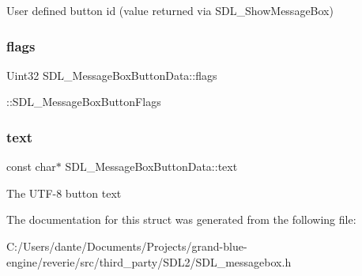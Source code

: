 User defined button id (value returned via S\+D\+L\+\_\+\+Show\+Message\+Box) \mbox{\label{struct_s_d_l___message_box_button_data_a426c8b5da0e718242c7840706d95de0b}} 
\subsubsection{\texorpdfstring{flags}{flags}}
{\footnotesize\ttfamily Uint32 S\+D\+L\+\_\+\+Message\+Box\+Button\+Data\+::flags}

\+::\+S\+D\+L\+\_\+\+Message\+Box\+Button\+Flags \mbox{\label{struct_s_d_l___message_box_button_data_af35f3062f0577159284c8828caaf08e4}} 
\subsubsection{\texorpdfstring{text}{text}}
{\footnotesize\ttfamily const char$\ast$ S\+D\+L\+\_\+\+Message\+Box\+Button\+Data\+::text}

The U\+T\+F-\/8 button text 

The documentation for this struct was generated from the following file\+:\begin{DoxyCompactItemize}
\item 
C\+:/\+Users/dante/\+Documents/\+Projects/grand-\/blue-\/engine/reverie/src/third\+\_\+party/\+S\+D\+L2/S\+D\+L\+\_\+messagebox.\+h\end{DoxyCompactItemize}
